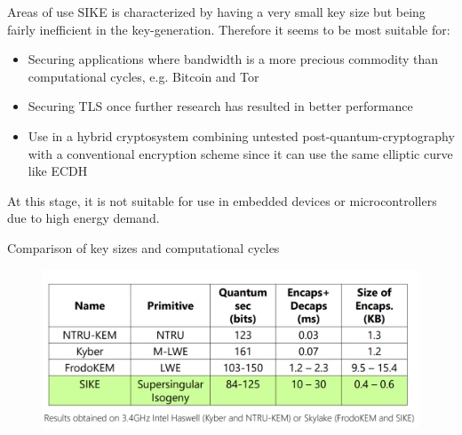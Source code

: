 \documentclass[handout]{beamer}
\begin{document}
\begin{frame}{Areas of use}
SIKE is characterized by having a very small key size but being fairly inefficient in the key-generation. Therefore it seems to be most suitable for:
\begin{itemize}[\textbullet]
	
	\item Securing applications where bandwidth is a more precious commodity than computational cycles, e.g. Bitcoin and Tor\pause
	\item Securing TLS once further research has resulted in better performance\pause
	\item Use in a hybrid cryptosystem combining untested post-quantum-cryptography with a conventional encryption scheme since it can use the same elliptic curve like ECDH	\pause
\end{itemize}
At this stage, it is not suitable for use in embedded devices or microcontrollers due to high energy demand.
\end{frame}

\begin{frame}{Comparison of key sizes and computational cycles}
\begin{figure} 
	\centering
	\includegraphics[width=1\linewidth]{performance}
	\label{fig:performance}
\end{figure}
\end{frame}
\end{document}

